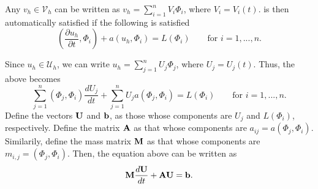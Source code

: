 \documentclass[oneside,a4paper,11pt]{report}
\begin{document}
Any $v_h \in \mathcal{V}_h$ can be written as $v_h = \sum_{i=1}^n V_i \Phi_i$, where $V_i = V_i(t)$.  is then automatically satisfied if the following is satisfied
\begin{equation}
    \left ( \frac{\partial u_h}{\partial t}, \Phi_i \right ) + a(u_h, \Phi_i) = L(\Phi_i) \qquad \text{for }i=1,...,n.
\end{equation}

Since $u_h \in \mathcal{U}_h$, we can write $u_h = \sum_{j=1}^n U_j \Phi_j$, where $U_j = U_j(t)$. Thus, the above becomes
\begin{equation}
    \sum_{j=1}^n (\Phi_j, \Phi_i) \frac{dU_j}{dt} + \sum_{j=1}^n U_j a(\Phi_j,\Phi_i) = L(\Phi_i) \qquad \text{for }i=1,...,n.
\end{equation}
Define the vectors $\mathbf{U}$ and $\mathbf{b}$, as those whose components are $U_j$ and $L(\Phi_i)$, respectively. Define the matrix $\mathbf{A}$ as that whose components are $a_{ij} = a(\Phi_j,\Phi_i)$. Similarily, define the mass matrix $\mathbf{M}$ as that whose components are $m_{i,j} = (\Phi_j, \Phi_i)$. Then, the equation above can be written as
\begin{equation}
    \mathbf{M} \frac{d \mathbf{U}}{dt} + \mathbf{A} \mathbf{U} = \mathbf{b}.
\end{equation}

\end{document}

